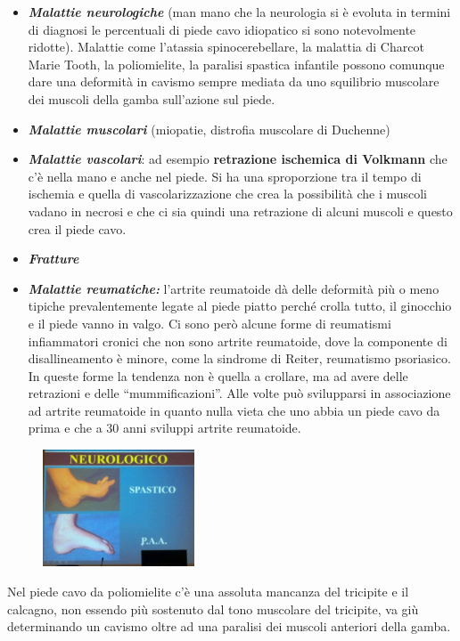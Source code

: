 \begin{itemize}
\item
  \emph{\textbf{Malattie neurologiche}} (man mano che la neurologia si è evoluta in termini di diagnosi le percentuali di piede cavo idiopatico si sono notevolmente ridotte). Malattie come l'atassia spinocerebellare, la malattia di Charcot Marie Tooth, la poliomielite, la paralisi spastica infantile possono comunque dare una deformità in cavismo sempre mediata da uno squilibrio muscolare dei muscoli della gamba sull'azione sul piede.
\item
  \emph{\textbf{Malattie muscolari}} (miopatie, distrofia muscolare di Duchenne)
\item
  \emph{\textbf{Malattie vascolari}}: ad esempio \textbf{retrazione ischemica di Volkmann} che c'è nella mano e anche nel piede. Si ha una sproporzione tra il tempo di ischemia e quella di vascolarizzazione che crea la possibilità che i muscoli vadano in necrosi e che ci sia quindi una retrazione di alcuni muscoli e questo crea il piede cavo.
\item
  \emph{\textbf{Fratture }}
\item
  \emph{\textbf{Malattie reumatiche:}} l'artrite reumatoide dà delle deformità più o meno tipiche prevalentemente legate al piede piatto perché crolla tutto, il ginocchio e il piede vanno in valgo. Ci sono però alcune forme di reumatismi infiammatori cronici che non sono artrite reumatoide, dove la componente di disallineamento è minore, come la sindrome di Reiter, reumatismo psoriasico. In queste forme la tendenza non è quella a crollare, ma ad avere delle retrazioni e delle ``mummificazioni''. Alle volte può svilupparsi in associazione ad artrite reumatoide in quanto nulla vieta che uno abbia un piede cavo da prima e che a 30 anni sviluppi artrite reumatoide.
\end{itemize}

\begin{figure}[!ht]
\centering
\includegraphics[width=0.4\textwidth]{017/image1.jpg}
\end{figure}

Nel piede cavo da poliomielite c'è una assoluta mancanza del tricipite e il calcagno, non essendo più sostenuto dal tono muscolare del tricipite, va giù determinando un cavismo oltre ad una paralisi dei muscoli anteriori della gamba.

